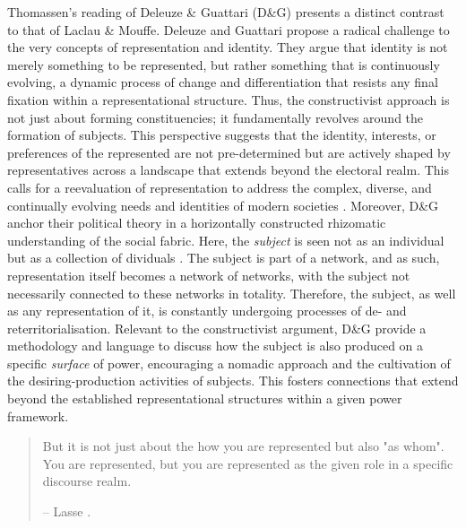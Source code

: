 Thomassen's reading of Deleuze \& Guattari (D\&G) presents a distinct contrast to that of Laclau \& Mouffe. Deleuze and Guattari propose a radical challenge to the very concepts of representation and identity. They argue that identity is not merely something to be represented, but rather something that is continuously evolving, a dynamic process of change and differentiation that resists any final fixation within a representational structure. Thus, the constructivist approach is not just about forming constituencies; it fundamentally revolves around the formation of subjects. This perspective suggests that the identity, interests, or preferences of the represented are not pre-determined but are actively shaped by representatives across a landscape that extends beyond the electoral realm. This calls for a reevaluation of representation to address the complex, diverse, and continually evolving needs and identities of modern societies \parencite[543-547]{thomassen2017}. Moreover, D\&G anchor their political theory in a horizontally constructed rhizomatic understanding of the social fabric. Here, the \textit{subject} is seen not as an individual but as a collection of dividuals  \parencite[7ff]{deleuze1983}. The subject is part of a network, and as such, representation itself becomes a network of networks, with the subject not necessarily connected to these networks in totality. Therefore, the subject, as well as any representation of it, is constantly undergoing processes of de- and reterritorialisation. Relevant to the constructivist argument, D\&G provide a methodology and language to discuss how the subject is also produced on a specific \textit{surface} of power, encouraging a nomadic approach and the cultivation of the desiring-production activities of subjects. This fosters connections that extend beyond the established representational structures within a given power framework.




\begin{quote}

  But it is not just about the how you are represented but also "as whom". 
  You are represented, but you are represented as the given role in a specific 
  discourse realm.

  -- Lasse \cite{thomassen2017}.
\end{quote}



